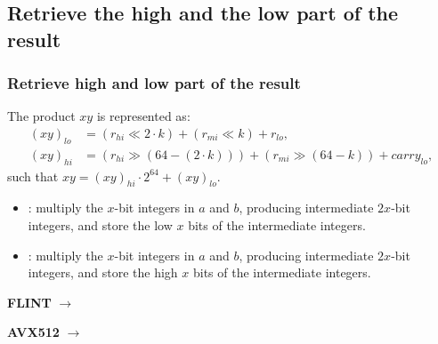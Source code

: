 \documentclass[10pt]{beamer}
\begin{document}
\subsection{Retrieve the high and the low part of the result}
\begin{frame}
    \frametitle{Retrieve high and low part of the result}
    \begin{mybox}
        The product $xy$ is represented as:
        \begin{align*}
            (xy)_{lo} &= (r_{hi} \ll 2\cdot k) + (r_{mi} \ll k) + r_{lo}, \\
            (xy)_{hi} &= (r_{hi} \gg (64 - (2\cdot k))) + (r_{mi} \gg (64 - k)) + carry_{lo},
        \end{align*}
        such that $xy = (xy)_{hi}\cdot 2^{64} + (xy)_{lo}$.
    \end{mybox}

    \pause
    \begin{itemize}
        \item {}: multiply the $x$-bit integers in $a$ and $b$, producing intermediate $2x$-bit integers, 
        and store the low $x$ bits of the intermediate integers.
        \item {}: multiply the $x$-bit integers in $a$ and $b$, producing intermediate $2x$-bit integers, 
        and store the high $x$ bits of the intermediate integers.
    \end{itemize}

    \pause
    \medskip
    \textbf{FLINT} $\longrightarrow$ 

    \pause
    \medskip
    \textbf{AVX512} $\longrightarrow$ 

    \begin{table}[h!]
        \centering
    \end{table}
\end{frame}
\end{document}
